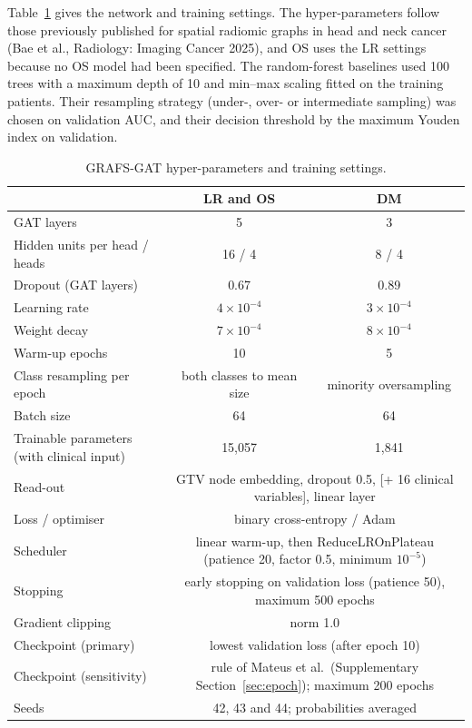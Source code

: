 \documentclass[11pt]{article}
\providecommand{\botrule}{\bottomrule}
\newcommand{\method}{GRAFS-GAT}  %
\begin{document}
Table~\ref{tab:gat} gives the network and training settings. The hyper-parameters follow those previously published for spatial radiomic graphs in head and neck cancer (Bae et al., Radiology: Imaging Cancer 2025), and OS uses the LR settings because no OS model had been specified. The random-forest baselines used 100 trees with a maximum depth of 10 and min--max scaling fitted on the training patients. Their resampling strategy (under-, over- or intermediate sampling) was chosen on validation AUC, and their decision threshold by the maximum Youden index on validation.

\begin{table}[!htb]
\centering\small
\caption{\method{} hyper-parameters and training settings.}\label{tab:gat}
\begin{tabular}{@{}lcc@{}}
\toprule
 & LR and OS & DM \\
\midrule
GAT layers & 5 & 3 \\
Hidden units per head / heads & 16 / 4 & 8 / 4 \\
Dropout (GAT layers) & 0.67 & 0.89 \\
Learning rate & $4\times10^{-4}$ & $3\times10^{-4}$ \\
Weight decay & $7\times10^{-4}$ & $8\times10^{-4}$ \\
Warm-up epochs & 10 & 5 \\
Class resampling per epoch & both classes to mean size & minority oversampling \\
Batch size & 64 & 64 \\
Trainable parameters (with clinical input) & 15,057 & 1,841 \\
\midrule
Read-out & \multicolumn{2}{c}{GTV node embedding, dropout 0.5, [+ 16 clinical variables], linear layer} \\
Loss / optimiser & \multicolumn{2}{c}{binary cross-entropy / Adam} \\
Scheduler & \multicolumn{2}{c}{linear warm-up, then ReduceLROnPlateau (patience 20, factor 0.5, minimum $10^{-5}$)} \\
Stopping & \multicolumn{2}{c}{early stopping on validation loss (patience 50), maximum 500 epochs} \\
Gradient clipping & \multicolumn{2}{c}{norm 1.0} \\
Checkpoint (primary) & \multicolumn{2}{c}{lowest validation loss (after epoch 10)} \\
Checkpoint (sensitivity) & \multicolumn{2}{c}{rule of Mateus et al.\ (Supplementary Section~\ref{sec:epoch}); maximum 200 epochs} \\
Seeds & \multicolumn{2}{c}{42, 43 and 44; probabilities averaged} \\
\botrule
\end{tabular}
\end{table}
\end{document}
